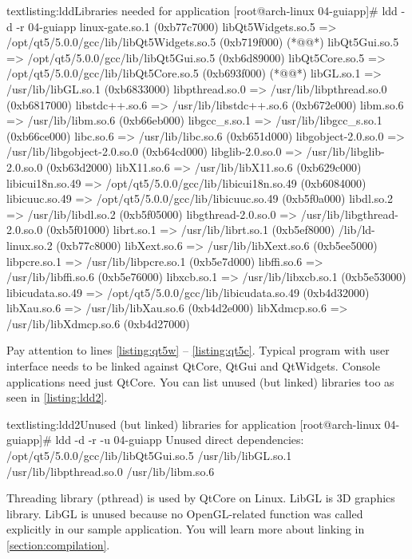 \begin{fdoccode}{text}{listing:ldd}{Libraries needed for  application}
[root@arch-linux 04-guiapp]# ldd -d -r 04-guiapp
linux-gate.so.1 (0xb77c7000)
libQt5Widgets.so.5 => /opt/qt5/5.0.0/gcc/lib/libQt5Widgets.so.5 (0xb719f000) (*@\label{listing:qt5w}@*)
libQt5Gui.so.5 => /opt/qt5/5.0.0/gcc/lib/libQt5Gui.so.5 (0xb6d89000)
libQt5Core.so.5 => /opt/qt5/5.0.0/gcc/lib/libQt5Core.so.5 (0xb693f000) (*@\label{listing:qt5c}@*)
libGL.so.1 => /usr/lib/libGL.so.1 (0xb6833000)
libpthread.so.0 => /usr/lib/libpthread.so.0 (0xb6817000)
libstdc++.so.6 => /usr/lib/libstdc++.so.6 (0xb672e000)
libm.so.6 => /usr/lib/libm.so.6 (0xb66eb000)
libgcc_s.so.1 => /usr/lib/libgcc_s.so.1 (0xb66ce000)
libc.so.6 => /usr/lib/libc.so.6 (0xb651d000)
libgobject-2.0.so.0 => /usr/lib/libgobject-2.0.so.0 (0xb64cd000)
libglib-2.0.so.0 => /usr/lib/libglib-2.0.so.0 (0xb63d2000)
libX11.so.6 => /usr/lib/libX11.so.6 (0xb629c000)
libicui18n.so.49 => /opt/qt5/5.0.0/gcc/lib/libicui18n.so.49 (0xb6084000)
libicuuc.so.49 => /opt/qt5/5.0.0/gcc/lib/libicuuc.so.49 (0xb5f0a000)
libdl.so.2 => /usr/lib/libdl.so.2 (0xb5f05000)
libgthread-2.0.so.0 => /usr/lib/libgthread-2.0.so.0 (0xb5f01000)
librt.so.1 => /usr/lib/librt.so.1 (0xb5ef8000)
/lib/ld-linux.so.2 (0xb77c8000)
libXext.so.6 => /usr/lib/libXext.so.6 (0xb5ee5000)
libpcre.so.1 => /usr/lib/libpcre.so.1 (0xb5e7d000)
libffi.so.6 => /usr/lib/libffi.so.6 (0xb5e76000)
libxcb.so.1 => /usr/lib/libxcb.so.1 (0xb5e53000)
libicudata.so.49 => /opt/qt5/5.0.0/gcc/lib/libicudata.so.49 (0xb4d32000)
libXau.so.6 => /usr/lib/libXau.so.6 (0xb4d2e000)
libXdmcp.so.6 => /usr/lib/libXdmcp.so.6 (0xb4d27000)
\end{fdoccode}

Pay attention to lines \ref{listing:qt5w} -- \ref{listing:qt5c}. Typical program with user interface needs to be linked against QtCore, QtGui and QtWidgets. Console applications need just QtCore. You can list unused (but linked) libraries too as seen in \autoref{listing:ldd2}.

\begin{fdoccode}{text}{listing:ldd2}{Unused (but linked) libraries for  application}
[root@arch-linux 04-guiapp]# ldd -d -r -u 04-guiapp
Unused direct dependencies:
/opt/qt5/5.0.0/gcc/lib/libQt5Gui.so.5
/usr/lib/libGL.so.1
/usr/lib/libpthread.so.0
/usr/lib/libm.so.6
\end{fdoccode}

Threading library (pthread) is used by QtCore on Linux. LibGL is 3D graphics library. LibGL is unused because no OpenGL-related function was called explicitly in our sample application. You will learn more about linking in \autoref{section:compilation}.

